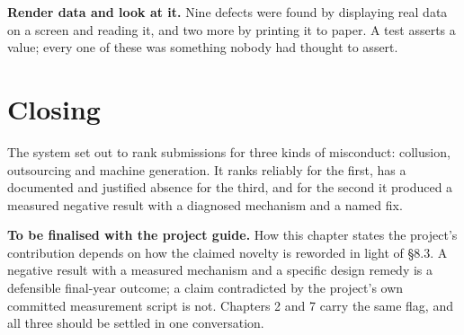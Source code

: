 \textbf{Render data and look at it.} Nine defects were found by
displaying real data on a screen and reading it, and two more by
printing it to paper. A test asserts a value; every one of these was
something nobody had thought to assert.

\hypertarget{closing}{%
\section{Closing}\label{closing}}

The system set out to rank submissions for three kinds of misconduct:
collusion, outsourcing and machine generation. It ranks reliably for the
first, has a documented and justified absence for the third, and for the
second it produced a measured negative result with a diagnosed mechanism
and a named fix.

\begin{draftnote}

\textbf{To be finalised with the project guide.} How this chapter states
the project's contribution depends on how the claimed novelty is
reworded in light of \S{}8.3. A negative result with a measured mechanism
and a specific design remedy is a defensible final-year outcome; a claim
contradicted by the project's own committed measurement script is not.
Chapters 2 and 7 carry the same flag, and all three should be settled in
one conversation.

\end{draftnote}
